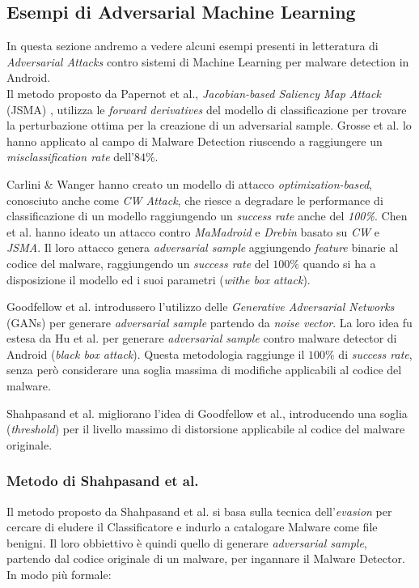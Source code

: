 \subsection{Esempi di Adversarial Machine Learning}
In questa sezione andremo a vedere alcuni esempi presenti in letteratura di \textit{Adversarial Attacks} contro sistemi di Machine Learning per malware detection in Android.\\

Il metodo proposto da Papernot et al., \textit{Jacobian-based Saliency Map Attack} (JSMA) \cite{8672711}, utilizza le \textit{forward derivatives} del modello di classificazione per trovare la perturbazione ottima per la creazione di un adversarial sample. Grosse et al. lo hanno applicato al campo di Malware Detection riuscendo a raggiungere un \textit{misclassification rate} dell'\(84\%\).

Carlini \& Wanger hanno creato un modello di attacco \textit{optimization-based}, conosciuto anche come \textit{CW Attack}\cite{8672711}, che riesce a degradare le performance di classificazione di un modello raggiungendo un \textit{success rate} anche del \textit{100\%}. Chen et al. hanno ideato un attacco contro \textit{MaMadroid} e \textit{Drebin} basato su \textit{CW} e \textit{JSMA}. Il loro attacco genera \textit{adversarial sample} aggiungendo \textit{feature} binarie al codice del malware, raggiungendo un \textit{success rate} del \(100\%\) quando si ha a disposizione il modello ed i suoi parametri (\textit{withe box attack}).

Goodfellow et al. introdussero \cite{8672711} l'utilizzo delle \textit{Generative Adversarial Networks} (GANs) per generare \textit{adversarial sample} partendo da \textit{noise vector}. La loro idea fu estesa da Hu et al. per generare \textit{adversarial sample} contro malware detector di Android (\textit{black box attack}). Questa metodologia raggiunge il \(100\%\) di \textit{success rate}, senza però considerare una soglia massima di modifiche applicabili al codice del malware.

Shahpasand et al.\cite{8672711} migliorano l'idea di Goodfellow et al., introducendo una soglia (\textit{threshold}) per il livello massimo di distorsione applicabile al codice del malware originale. 

\subsubsection{Metodo di Shahpasand et al.}
Il metodo proposto da Shahpasand et al.\cite{8672711} si basa sulla tecnica dell'\textit{evasion} per cercare di eludere il Classificatore e indurlo a catalogare Malware come file benigni. Il loro obbiettivo è quindi quello di generare \textit{adversarial sample}, partendo dal codice originale di un malware, per ingannare il Malware Detector. In modo più formale:

